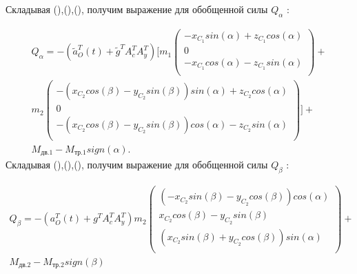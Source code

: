 Складывая (),(),(), получим выражение для обобщенной силы  \( Q_{ \alpha } \) :\par


\begin{equation} %
\label{eq:p3:40}
\begin{multlined}
Q_{ \alpha }=- \left( \tilde{a}_{O}^{T} \left( t \right) +\tilde{g}^{T}A_{c}^{T}A_{y}^{T} \right)  
[  
m_{1} \left( \begin{matrix}
-x_{C_{1}}sin \left(  \alpha  \right) +z_{C_{1}}cos \left(  \alpha  \right) \\
0\\
-x_{C_{1}}cos \left(  \alpha  \right) -z_{C_{1}}sin \left(  \alpha  \right) \\
\end{matrix}
\right) + \\
m_{2} \left( \begin{matrix}
- \left( x_{C_{2}}cos \left(  \beta  \right) -y_{C_{2}}sin \left(  \beta  \right)  \right) sin \left(  \alpha  \right) +z_{C_{2}}cos \left(  \alpha  \right) \\
0\\
- \left( x_{C_{2}}cos \left(  \beta  \right) -y_{C_{2}}sin \left(  \beta  \right)  \right) cos \left(  \alpha  \right) -z_{C_{2}}sin \left(  \alpha  \right) \\
\end{matrix}\right)  
]  + \\
M_{\textit{дв.1}}-M_{\textit{тр.1}}sign \left(  \alpha  \right) .
\end{multlined}
\end{equation}
Складывая (),(),(), получим выражение для обобщенной силы  \( Q_{ \beta } \) :\par


\begin{equation} %
\label{eq:p3:41}
\begin{multlined}
Q_{ \beta }=- \left( a_{O}^{T} \left( t \right) +g^{T}A_{c}^{T}A_{y}^{T} \right) m_{2} \left( \begin{matrix}
\left( -x_{C_{2}}sin \left(  \beta  \right) -y_{C_{2}}cos \left(  \beta  \right)  \right) cos \left(  \alpha  \right) \\
x_{C_{2}}cos \left(  \beta  \right) -y_{C_{2}}sin \left(  \beta  \right) \\
\left( x_{C_{2}}sin \left(  \beta  \right) +y_{C_{2}}cos \left(  \beta  \right)  \right) sin \left(  \alpha  \right) \\
\end{matrix}
\right) + \\
M_{\textit{дв.2}}-M_{\textit{тр.2}}sign \left(  \beta  \right) 
\end{multlined}
\end{equation}



